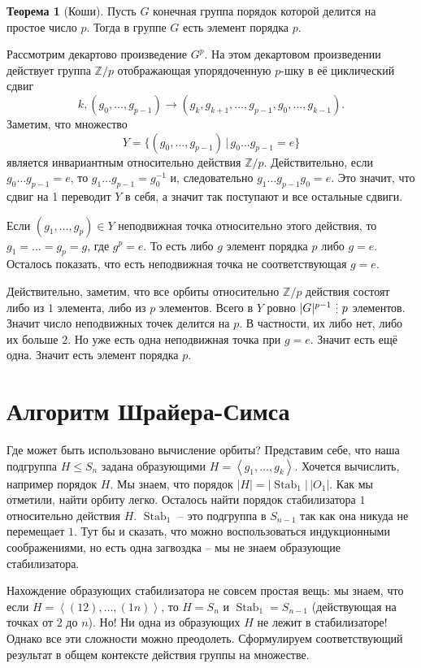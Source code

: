 \documentclass[10pt,a4paper,oneside]{book}
\theoremstyle{definition}
\newtheorem{thm}{\color{red!40!black}Теорема}
\renewcommand{\leq}{\leqslant}
\newcommand{\mb}[1]{\mathbb{#1}}
\newcommand{\Stab}{\operatorname{Stab}}
\newcommand{\di}{\mathop{\,\scalebox{0.85}{\raisebox{-1.2pt}[0.5\height]{\vdots}}\,}}
\def\lan{\left\langle }
\def\ran{\right\rangle}
\def\thrm{\begin{thm}}
\def\ethrm{\end{thm}}
\begin{document}
\thrm[Коши] Пусть $G$ конечная группа порядок которой делится на простое число $p$. Тогда в группе $G$ есть элемент порядка $p$.
\ethrm
\proof Рассмотрим декартово произведение $G^p$. На этом декартовом произведении действует группа $\mb Z/p$ отображающая упорядоченную $p$-шку в её циклический сдвиг 
$$k,(g_0,\dots,g_{p-1})\to (g_k,g_{k+1},\dots,g_{p-1},g_0,\dots,g_{k-1}).$$
Заметим, что множество $$Y=\{(g_0,\dots,g_{p-1})\,|\, g_0\dots g_{p-1}=e\}$$
является инвариантным относительно действия $\mb Z/p$. Действительно, если $g_0\dots g_{p-1}=e$, то $g_1\dots g_{p-1}=g_0^{-1}$ и, следовательно $g_1\dots g_{p-1} g_0=e$. Это значит, что сдвиг на 1 переводит $Y$ в себя, а значит так поступают и все остальные сдвиги.

Если $(g_1,\dots,g_p)\in Y$ неподвижная точка относительно этого действия, то $g_1=\dots=g_p=g$, где $g^p=e$. То есть либо $g$ элемент порядка $p$ либо $g=e$. Осталось показать, что есть неподвижная точка не соответствующая $g=e$.

Действительно, заметим, что все орбиты относительно $\mb Z/p$ действия состоят либо из $1$ элемента, либо из $p$ элементов. Всего в $Y$ ровно $|G|^{p-1}\di p$ элементов. Значит число неподвижных точек делится на $p$. В частности, их либо нет, либо их больше $2$. Но уже есть одна неподвижная точка при $g=e$. Значит есть ещё одна. Значит есть  элемент порядка $p$.
\endproof


\section{Алгоритм Шрайера-Симса}

Где может быть использовано вычисление орбиты? Представим себе, что наша подгруппа $H \leq S_n$ задана образующими $H=\lan g_1,\dots,g_k\ran$. Хочется вычислить, например порядок $H$. Мы знаем, что порядок $|H|=|\Stab_1|\,|O_1|$. Как мы отметили, найти орбиту легко. Осталось найти порядок стабилизатора $1$ относительно действия $H$. $\Stab_1$ -- это подгруппа в $S_{n-1}$ так как она никуда не перемещает $1$. Тут бы и сказать, что можно воспользоваться индукционными соображениями, но есть одна загвоздка -- мы не знаем образующие стабилизатора.

Нахождение образующих стабилизатора не совсем простая вещь: мы знаем, что если $H=\lan (12),\dots,(1n)\ran$, то $H=S_n$ и $\Stab_1=S_{n-1}$ (действующая на точках от $2$ до $n$). Но! Ни одна из образующих $H$ не лежит в стабилизаторе! Однако все эти сложности можно преодолеть. Сформулируем соответствующий результат  в общем контексте действия группы на множестве.
\end{document}
